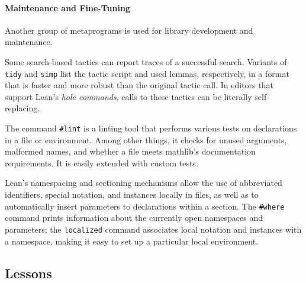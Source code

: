 \documentclass[sigplan]{acmart}\settopmatter{}
\newcommand{\mathlib}{\textsf{mathlib}\xspace}
\begin{document}
%


\paragraph{Maintenance and Fine-Tuning} Another group of meta\-programs is used for library development and maintenance.

Some search-based tactics can report traces of a successful search.
Variants of \lstinline{tidy} and \lstinline{simp}
list the tactic script and used lemmas, respectively,
in a format that is faster and more robust than the original tactic call.
In editors that support Lean's \emph{hole commands},
calls to these tactics can be literally self-replacing.

The command \lstinline{#lint} is a linting tool
that performs various tests on declarations in a file or environment.
Among other things, it checks for unused arguments, malformed names, and
whether a file meets \mathlib's documentation requirements.
It is easily extended with custom tests.

Lean's namespacing and sectioning mechanisms
allow the use of abbreviated identifiers, special notation, and instances
locally in files,
as well as to automatically insert parameters to declarations within a section.
The \lstinline{#where} command prints information about the currently open namespaces and parameters;
the \lstinline{localized} command associates local notation and instances with a namespace, making it easy to set up a particular local environment.

\subsection{Lessons}
\end{document}
